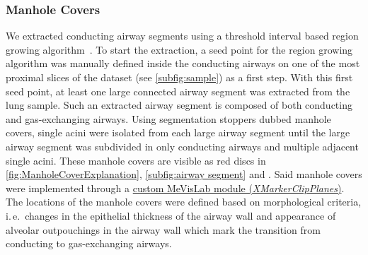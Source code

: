 \documentclass[a4paper,DIVcalc,abstract,english]{scrartcl}
\newcommand{\ie}{i.\,e.\ }
\begin{document}
\subsubsection{Manhole Covers}
We extracted conducting airway segments using a threshold interval based region growing algorithm~\cite{Zucker1976}.
To start the extraction, a seed point for the region growing algorithm was manually defined inside the conducting airways on one of the most proximal slices of the dataset (see \autoref{subfig:sample}) as a first step.
With this first seed point, at least one large connected airway segment was extracted from the lung sample.
Such an extracted airway segment is composed of both conducting and gas-exchanging airways.
Using segmentation stoppers dubbed manhole covers, single acini were isolated from each large airway segment until the large airway segment was subdivided in only conducting airways and multiple adjacent single acini.
These manhole covers are visible as red discs in \autoref{fig:ManholeCoverExplanation}, \autoref{subfig:airway segment} and .
Said manhole covers were implemented through a \href{http://www.mevis-research.de/cgi-bin/discus/board-auth.cgi?lm=1282233250&file=/839/11760.html}{custom MeVisLab module (\emph{XMarkerClipPlanes})}.
The locations of the manhole covers were defined based on morphological criteria, \ie changes in the epithelial thickness of the airway wall and appearance of alveolar outpouchings in the airway wall which mark the transition from conducting to gas-exchanging airways.
\end{document}
